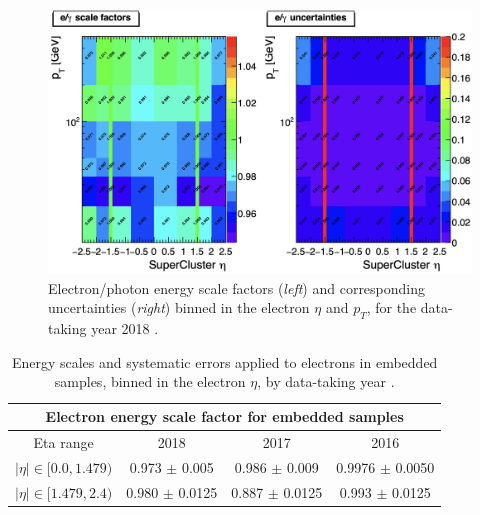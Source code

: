 \begin{figure}[h]
    \centering
    \includegraphics[width=15cm]{figures/ch-8-scale-factors-and-corrections/egamma-POG-UL-egamma-scale-factors.png}
    \caption[Electron/photon energy scale factors and uncertainties for 2018.]{Electron/photon energy scale factors (\textit{left}) and corresponding uncertainties (\textit{right}) binned in the electron $\eta$ and $p_{T}$, for the data-taking year 2018 \cite{twiki_Electron_UL_2016_2017_2018}.} 
    \label{fig:egamma-POG-UL-egamma-scale-factors}
\end{figure}


\begin{table}[h]
    \centering
    \begin{tabular}{|c|c|c|c|}
    \hline
    \multicolumn{4}{|c|}{Electron energy scale factor for embedded samples}                                   \\ \hline
    \hline
    Eta range                   & 2018               & 2017               & 2016     \\ \hline
    $|\eta| \in [0.0, 1.479)$   & 0.973 $\pm$ 0.005  & 0.986 $\pm$ 0.009  & 0.9976 $\pm$ 0.0050 \\
    $|\eta| \in [1.479, 2.4)$   & 0.980 $\pm$ 0.0125 & 0.887 $\pm$ 0.0125 & 0.993 $\pm$ 0.0125 \\ \hline
    \end{tabular}
    \caption[Energy scales and systematic errors applied to electrons in embedded samples by data-taking year/era.]{Energy scales and systematic errors applied to electrons in embedded samples, binned in the electron $\eta$, by data-taking year \cite{twiki_embedded_preUL_2016} \cite{twiki_embedded_preUL_2017} \cite{twiki_embedded_preUL_2018}.}
    \label{table:ele-ES-embedded}
\end{table}

